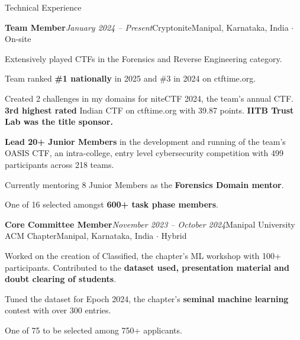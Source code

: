\documentclass{resume} %
\begin{document}
\begin{rSection}{Technical Experience}
\begin{rSubsection}{\bf Team Member}{\em January 2024 -- Present}{Cryptonite}{Manipal, Karnataka, India $\cdot$ On-site}
\item Extensively played CTFs in the Forensics and Reverse Engineering category.
\item Team ranked \textbf{\#1 nationally} in 2025 and \#3 in 2024 on ctftime.org.
\item Created 2 challenges in my domains for niteCTF 2024, the team's annual CTF. \textbf{3rd highest rated} Indian CTF on ctftime.org with 39.87 points. \textbf{IITB Trust Lab was the title sponsor.}
\item \textbf{Lead 20+ Junior Members} in the development and running of the team's OASIS CTF, an intra-college, entry level cybersecurity competition with 499 participants across 218 teams.
\item Currently mentoring 8 Junior Members as the \textbf{Forensics Domain mentor}.
\item One of 16 selected amongst \textbf{600+ task phase members}.
\end{rSubsection}
\begin{rSubsection}{\bf Core Committee Member}{\em November 2023 -- October 2024}{Manipal University ACM Chapter}{Manipal, Karnataka, India $\cdot$ Hybrid}
\item Worked on the creation of Classified, the chapter's ML workshop with 100+ participants. Contributed to the \textbf{dataset used, presentation material and doubt clearing of students}.
\item Tuned the dataset for Epoch 2024, the chapter's \textbf{seminal machine learning} contest with over 300 entries.
\item One of 75 to be selected among 750+ applicants.
\end{rSubsection}

\end{rSection}
\end{document}
